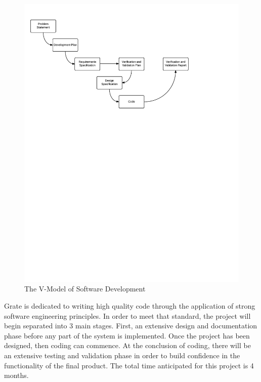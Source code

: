\documentclass[12pt, titlepage]{article}
\begin{document}
\begin{figure}[H]
  \includegraphics[scale=0.74]{OverviewOfProcess.pdf}
  \caption{The V-Model of Software Development \citep{smith5}}
\end{figure}

Grate is dedicated to writing high quality code through the application of 
strong software engineering principles. In order to meet that standard, the 
project will begin separated into 3 main stages. First, an extensive design and 
documentation phase before any part of the system is implemented. Once the 
project has been designed, then coding can commence. At the conclusion of 
coding, there will be an extensive testing and validation phase in order to 
build confidence in the functionality of the final product. The total time 
anticipated for this project is 4 months.
\end{document}
